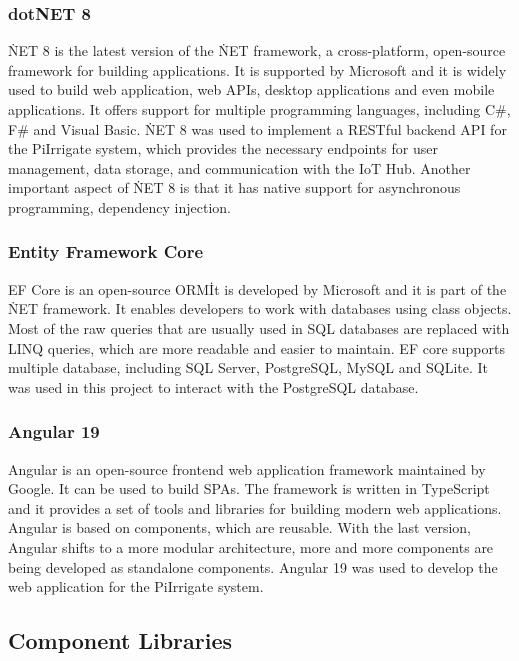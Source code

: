 \subsubsection{dotNET 8}
\.NET 8 is the latest version of the \.NET framework, a cross-platform, open-source framework for building applications. It is supported by Microsoft
and it is widely used to build web application, web APIs, desktop applications and even mobile applications. It offers support for multiple programming
languages, including C\#, F\# and Visual Basic. \.NET 8 was used to implement a RESTful backend API for the PiIrrigate system, 
which provides the necessary endpoints for user management, data storage, and communication with the IoT Hub. Another important aspect of \.NET 8
is that it has native support for asynchronous programming, dependency injection\cite{dotnet8_docs}\cite{microsoft_dotnet}.

\subsubsection{Entity Framework Core}
EF Core is an open-source ORM\. It is developed by Microsoft and it is part of the \.NET framework. It enables developers
to work with databases using class objects. Most of the raw queries that are usually used in SQL databases are replaced with LINQ queries, 
which are more readable and easier to maintain. EF core supports multiple database, including SQL Server, PostgreSQL, MySQL and SQLite.
It was used in this project to interact with the PostgreSQL database\cite{efcore}\cite{efcore_docs}.


\subsubsection{Angular 19}
Angular is an open-source frontend web application framework maintained by Google. It can be used to build SPAs. The framework is written in 
TypeScript and it provides a set of tools and libraries for building modern web applications. Angular is based on components, which are reusable. 
With the last version, Angular shifts to a more modular architecture, more and more components are being developed as standalone components.
Angular 19 was used to develop the web application for the PiIrrigate system\cite{angular_19_release}\cite{angular_docs}.

\subsection{Component Libraries}
